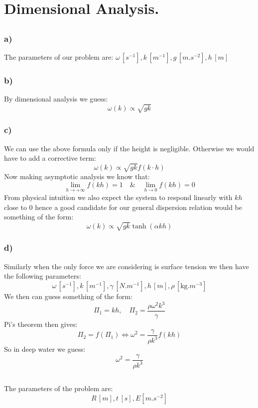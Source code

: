 \documentclass[10pt,a4paper]{book}
\begin{document}
\section{Dimensional Analysis.}
\subsection{}
\subsubsection{a)}
The parameters of our problem are: $\omega\, [s^{-1}], k\, [m^{-1}], g\, [m.s^{-2}], h\, [m]$

\subsubsection{b)}
By dimensional analysis we guess:
\[
\omega(k) \propto \sqrt{g k}
\]

\subsubsection{c)}
We can use the above formula only if the height is negligible. Otherwise we would have to add a corrective term:
\[
\omega(k) \propto \sqrt{gk} f(k \cdot h) 
\]
Now making asymptotic analysis we know that:
\[
\lim_{h \to +\infty} f(k h) = 1 \quad \& \quad \lim_{h \to 0} f(kh) = 0
\]
From physical intuition we also expect the system to respond linearly with $kh$ close to 0 hence a good candidate for our general dispersion relation would be something of the form:
\[
\omega(k) \propto \sqrt{gk}\tanh(\alpha kh)
\]

\subsubsection{d)}
Similarly when the only force we are considering is surface tension we then have the following parameters: 
\[
\omega\, [s^{-1}], k\, [m^{-1}], \gamma\, [N.m^{-1}], h\, [m], \rho \, [\text{kg}.m^{-3}]
\]
We then can guess something of the form:
\[
\Pi_1 = k h, \quad \Pi_2 = \frac{\rho \omega^2 k^3}{\gamma}
\]
Pi's theorem then gives:
\[
\Pi_2 = f(\Pi_1) \Leftrightarrow \omega^2 = \frac{\gamma}{\rho k^3} f(kh)
\]
So in deep water we guess:
\[
\omega^2 = \frac{\gamma}{\rho k^3}
\]

\subsection{}
The parameters of the problem are:
\[
R\,[m], t\, [s], E [m.s^{-2}] 
\]
\end{document}
